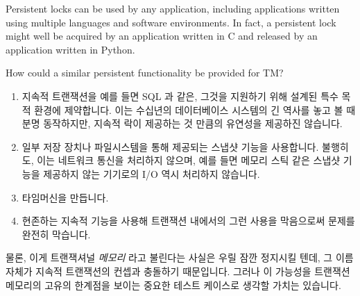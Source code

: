 Persistent locks can be used by any application, including applications
written using multiple languages and software environments.
In fact, a persistent lock might well be acquired by an application written
in C and released by an application written in Python.

How could a similar persistent functionality be provided for TM?

\fi

\begin{enumerate}
\item	지속적 트랜잭션을 예를 들면 SQL 과 같은, 그것을 지원하기 위해 설계된
	특수 목적 환경에 제약합니다.
	이는 수십년의 데이터베이스 시스템의 긴 역사를 놓고 볼 때 분명
	동작하지만, 지속적 락이 제공하는 것 만큼의 유연성을 제공하진 않습니다.
\item	일부 저장 장치나 파일시스템을 통해 제공되는 스냅샷 기능을 사용합니다.
	불행히도, 이는 네트워크 통신을 처리하지 않으며, 예를 들면 메모리 스틱
	같은 스냅샷 기능을 제공하지 않는 기기로의 I/O 역시 처리하지 않습니다.
\item	타임머신을 만듭니다.
\item	현존하는 지속적 기능을 사용해 트랜잭션 내에서의 그런 사용을 막음으로써
	문제를 완전히 막습니다.

\end{enumerate}

물론, 이게 트랜잭셔널 \emph{메모리} 라고 불린다는 사실은 우릴 잠깐 정지시킬
텐데, 그 이름 자체가 지속적 트랜잭션의 컨셉과 충돌하기 때문입니다.
그러나 이 가능성을 트랜잭션 메모리의 고유의 한계점을 보이는 중요한 테스트
케이스로 생각할 가치는 있습니다.

